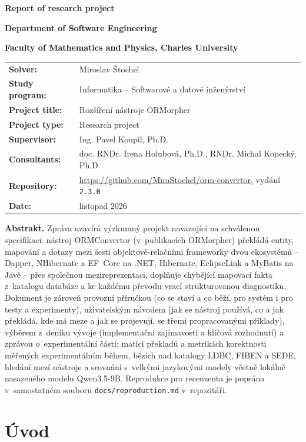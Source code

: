 \documentclass{article}
\title{\ProjectTitle}
\author{\StudentsFullName}
\def\ResearchProject{Research project}
\def\StudentsFullName{Miroslav Štochel}
\def\StudyProgram{Informatika -- Softwarové a datové inženýrství}
\def\ProjectTitle{Rozšíření nástroje ORMorpher}
\def\ProjectType{\ResearchProject}
\def\SupervisorFullName{Ing. Pavel Koupil, Ph.D.}
\def\ConsultantsFullName{doc. RNDr. Irena Holubová, Ph.D., RNDr. Michal Kopecký, Ph.D.}
\begin{document}
\shorthandoff{-}

\centerline{\Large \textbf{Report of research project}}
\centerline{ \textbf{Department of Software Engineering}}
\centerline{ \textbf{Faculty of Mathematics and Physics, Charles University}}
\bigskip
{\noindent\begin{tabular*}{\textwidth}{ >{\raggedleft}m{4cm} l}
 \textbf{Solver:} & \StudentsFullName \\
 \textbf{Study program:} & \StudyProgram \\[1em]
 \textbf{Project title:} & \ProjectTitle \\
 \textbf{Project type:} & \ProjectType \\[1em]
 \textbf{Supervisor:} & \SupervisorFullName \\
 \textbf{Consultants:} & \ConsultantsFullName \\[1em]
 \textbf{Repository:} & \url{https://github.com/MiraStochel/orm-convertor}, vydání \texttt{2.3.0} \\
 \textbf{Date:} & listopad 2026 \\
\end{tabular*}}

\bigskip
\noindent\textbf{Abstrakt.} Zpráva uzavírá výzkumný projekt navazující na schválenou specifikaci: nástroj ORMConvertor (v~publikacích ORMorpher) překládá entity, mapování a dotazy mezi šesti objektově-relačními frameworky dvou ekosystémů -- Dapper, NHibernate a EF~Core na .NET, Hibernate, EclipseLink a MyBatis na Javě -- přes společnou mezireprezentaci, doplňuje chybějící mapovací fakta z~katalogu databáze a ke každému převodu vrací strukturovanou diagnostiku. Dokument je zároveň provozní příručkou (co se staví a co běží, pro systém i pro testy a experimenty), uživatelským návodem (jak se nástroj používá, co a jak překládá, kde má meze a jak se projevují, se třemi propracovanými příklady), výběrem z~deníku vývoje (implementační zajímavosti a klíčová rozhodnutí) a zprávou o~experimentální části: matici překladů a metrikách korektnosti měřených experimentálním během, bězích nad katalogy LDBC, FIBEN a SEDE, hledání mezí nástroje a srovnání s~velkými jazykovými modely včetně lokálně nasazeného modelu Qwen3.5-9B. Reprodukce pro recenzenta je popsána v~samostatném souboru \texttt{docs/reproduction.md} v~repozitáři.

\tableofcontents
\clearpage

\section{Úvod}
\end{document}

